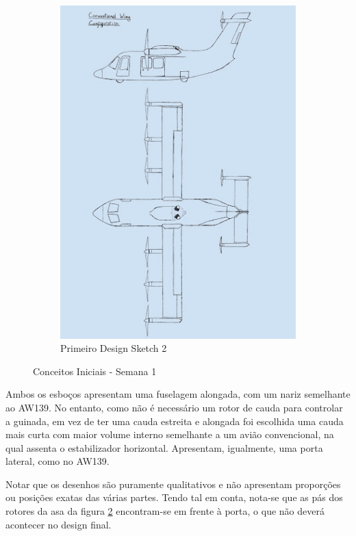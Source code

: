 \begin{figure}[h]
\begin{subfigure}[b]{0.47\textwidth}
        \includegraphics[width=\textwidth]{Imagens/inicialdesign2.jpg}
        \caption{Primeiro Design Sketch 2}
        \label{DesingSketchini2}
    \end{subfigure}
    \caption{Conceitos Iniciais - Semana 1}
\end{figure}
\FloatBarrier
Ambos os esboços apresentam uma fuselagem alongada, com um nariz semelhante ao AW139. No entanto, como não é necessário um rotor de cauda para controlar a guinada, em vez de ter uma cauda estreita e alongada foi escolhida uma cauda mais curta com maior volume interno semelhante a um avião convencional, na qual assenta o estabilizador horizontal. Apresentam, igualmente, uma porta lateral, como no AW139.\par
Notar que os desenhos são puramente qualitativos e não apresentam proporções ou posições exatas das várias partes. Tendo tal em conta, nota-se que as pás dos rotores da asa da figura \ref{DesingSketchini2} encontram-se em frente à porta, o que não deverá acontecer no design final.\par
